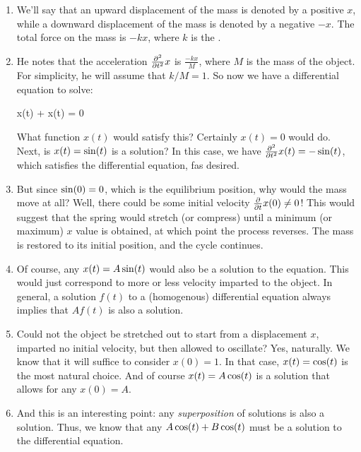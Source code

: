\begin{enumerate}
  \item We'll say that an upward displacement of the mass is denoted by
  a positive $x$, while a downward displacement of the mass is denoted
  by a negative $-x$. The total force on the mass is $-kx$, where $k$ is
  the .

  \item He notes that the acceleration $\frac{\partial^2 }{\partial {t}^2} x$ is
  $\frac{-kx}{M}$, where $M$ is the mass of the object. For simplicity,
  he will assume that $k/M=1$. So now we have a differential equation to
  solve:

  \begin{nedqn}
    x(t) +  x(t) = 0
  \end{nedqn}

  \noindent
  What function $x(t)$ would satisfy this? Certainly $x(t) = 0$ would
  do. Next, is $x(t) = \sin\mathopen{}\left( {t} \right)\mathclose{}$ is a solution? In this case, we have
  $\frac{\partial^2 }{\partial {t}^2} x(t) = -\sin\mathopen{}\left( {t} \right)\mathclose{}$, which satisfies the differential
  equation, fas desired.

  \item But since $\sin\mathopen{}\left( {0} \right)\mathclose{} = 0$, which is the equilibrium position, why
  would the mass move at all? Well, there could be some initial velocity
  $\frac{\partial }{\partial t} x(0) \ne 0$! This would suggest that the spring would
  stretch (or compress) until a minimum (or maximum) $x$ value is
  obtained, at which point the process reverses. The mass is restored to
  its initial position, and the cycle continues.

  \item Of course, any $x(t) = A \sin\mathopen{}\left( {t} \right)\mathclose{}$ would also be a solution to
  the equation. This would just correspond to more or less velocity
  imparted to the object. In general, a solution $f(t)$ to a
  (homogenous) differential equation always implies that $Af(t)$ is also
  a solution.

  \item Could not the object be stretched out to start from a
  displacement $x$, imparted no initial velocity, but then allowed to
  oscillate? Yes, naturally. We know that it will suffice to consider
  $x(0) = 1$. In that case, $x(t) = \cos\mathopen{}\left( {t} \right)\mathclose{}$ is the most natural
  choice. And of course $x(t) = A \cos\mathopen{}\left( {t} \right)\mathclose{}$ is a solution that allows
  for any $x(0) = A$.

  \item And this is an interesting point: any \emph{superposition} of
  solutions is also a solution. Thus, we know that any $A\cos\mathopen{}\left( {t} \right)\mathclose{} +
  B\cos\mathopen{}\left( {t} \right)\mathclose{}$ must be a solution to the differential equation.


\end{enumerate}

